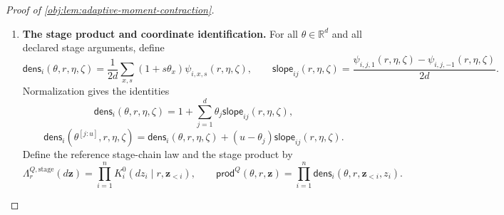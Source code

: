 \begin{proof}[Proof of \cref{obj:lem:adaptive-moment-contraction}]
\begin{enumerate}
Define the measurable good set
\[
\begin{split}
\mathcal G_i
=\biggl\{(r,\eta,\zeta):\;&
 \sum_{x,s}\psi^{\mathrm{raw}}_{i,x,s}(r,\eta,\zeta)=2d,\\
&\psi^{\mathrm{raw}}_{i,x,s}(r,\eta,\zeta)
 \le e^\varepsilon\psi^{\mathrm{raw}}_{i,x',s'}(r,\eta,\zeta)
 \ \text{for all }x,s,x',s'\biggr\},
\end{split}
\]
and set, on their full domains,
\[
\psi_{i,x,s}(r,\eta,\zeta)
=
\begin{cases}
\psi^{\mathrm{raw}}_{i,x,s}(r,\eta,\zeta),
 &(r,\eta,\zeta)\in\mathcal G_i,\\
1,&(r,\eta,\zeta)\notin\mathcal G_i.
\end{cases}
\]
For each \(r,\eta\), the good set has full reference measure. Hence this repair preserves every represented kernel and gives, everywhere,
\[
\sum_{x,s}\psi_{i,x,s}=2d,
\qquad
\psi_{i,x,s}\le e^\varepsilon\psi_{i,x',s'}.
\]
Summing the second inequality first over the left-hand input and then over the right-hand input yields
\[
2d\le 2d\,e^\varepsilon\psi_{i,x,s},
\qquad
2d\,\psi_{i,x,s}\le e^\varepsilon\sum_{x',s'}\psi_{i,x',s'}
=2d\,e^\varepsilon.
\]
Therefore
\[
e^{-\varepsilon}\le\psi_{i,x,s}(r,\eta,\zeta)\le e^\varepsilon
\qquad\text{everywhere}.
\]

\item \textbf{The stage product and coordinate identification.}
For all \(\theta\in\mathbb R^d\) and all declared stage arguments, define
\[
\mathsf{dens}_i(\theta,r,\eta,\zeta)
=
\frac1{2d}\sum_{x,s}(1+s\theta_x)\psi_{i,x,s}(r,\eta,\zeta),
\qquad
\mathsf{slope}_{ij}(r,\eta,\zeta)
=
\frac{\psi_{i,j,1}(r,\eta,\zeta)
      -\psi_{i,j,-1}(r,\eta,\zeta)}{2d}.
\]
Normalization gives the identities
\[
\mathsf{dens}_i(\theta,r,\eta,\zeta)
=1+\sum_{j=1}^d\theta_j\mathsf{slope}_{ij}(r,\eta,\zeta),
\]
\[
\mathsf{dens}_i(\theta^{[j:u]},r,\eta,\zeta)
=
\mathsf{dens}_i(\theta,r,\eta,\zeta)
+(u-\theta_j)\mathsf{slope}_{ij}(r,\eta,\zeta).
\]
Define the reference stage-chain law and the stage product by
\[
\Lambda_r^{Q,\mathrm{stage}}(d\mathbf z)
=\prod_{i=1}^n K_i^0(dz_i\mid r,\mathbf z_{<i}),
\qquad
\mathsf{prod}^Q(\theta,r,\mathbf z)
=\prod_{i=1}^n
 \mathsf{dens}_i(\theta,r,\mathbf z_{<i},z_i).
\]


\end{enumerate}
\end{proof}
